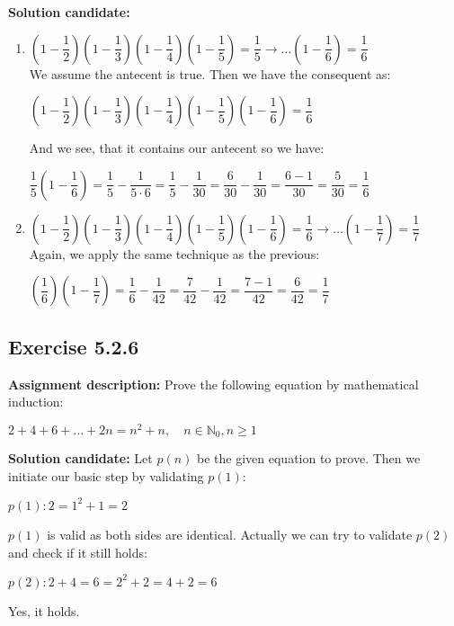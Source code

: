 \documentclass{report}
\newcommand{\cent}[1]{\begin{center}#1\end{center}}
\newcommand{\doubleN}{\mathbb{N}}
\newcommand{\In}{\! \in \!}
\newcommand{\assignmentDescription}{\textbf{Assignment description: }}
\newcommand{\solution}{\textbf{Solution candidate: }}
\newcommand{\QED}{\boxed{}}
\newcommand{\Exercise}[1]{\subsection{Exercise #1}}
\newcommand{\defaultEnumerateLabel}{\textbf{\alph*.}}
\newcommand{\myItem}[1]{\item #1\\}
\newcommand{\parenthesis}[1]{\left( #1 \right)}
\begin{document}
 	\solution
 	\begin{enumerate}[label=\defaultEnumerateLabel]
 		\myItem{$\parenthesis{1 - \dfrac{1}{2}}\parenthesis{1 - \dfrac{1}{3}}\parenthesis{1 - \dfrac{1}{4}}\parenthesis{1 - \dfrac{1}{5}} = \dfrac{1}{5} \to \dots \parenthesis{1 - \dfrac{1}{6}} = \dfrac{1}{6} $}
 		
 		We assume the antecent is true. Then we have the consequent as:
 		
 		\cent{$\parenthesis{1 - \dfrac{1}{2}}\parenthesis{1 - \dfrac{1}{3}}\parenthesis{1 - \dfrac{1}{4}}\parenthesis{1 - \dfrac{1}{5}}\parenthesis{1 - \dfrac{1}{6}} = \dfrac{1}{6}$}
 		
 		And we see, that it contains our antecent so we have: 
 		
 		\cent{$\dfrac{1}{5}\parenthesis{1 - \dfrac{1}{6}} =\dfrac{1}{5} - \dfrac{1}{5 \cdot 6} = \dfrac{1}{5} - \dfrac{1}{30} = \dfrac{6}{30} - \dfrac{1}{30} = \dfrac{6-1}{30} = \dfrac{5}{30} = \dfrac{1}{6}$}
 		
 		\QED
 		
 		\myItem{$\parenthesis{1 - \dfrac{1}{2}}\parenthesis{1 - \dfrac{1}{3}}\parenthesis{1 - \dfrac{1}{4}}\parenthesis{1 - \dfrac{1}{5}}\parenthesis{1 - \dfrac{1}{6}} = \dfrac{1}{6} \to \dots \parenthesis{1 - \dfrac{1}{7}} = \dfrac{1}{7} $}
 		
 		Again, we apply the same technique as the previous:
 		
 		\cent{$\parenthesis{\dfrac{1}{6}}\parenthesis{1 - \dfrac{1}{7}} = \dfrac{1}{6} - \dfrac{1}{42} = \dfrac{7}{42} - \dfrac{1}{42} = \dfrac{7-1}{42} = \dfrac{6}{42} = \dfrac{1}{7}$}
 		
 	\end{enumerate}
 	
 	\Exercise{5.2.6}
 	
 	\assignmentDescription
 	Prove the following equation by mathematical induction:
 	
 	\cent{$2+4+6+\dots +2n = n^2 + n, \quad n \In \doubleN_0, n \geq 1$}
 	
 	\solution
	Let $p(n)$ be the given equation to prove. Then we initiate our basic step by validating $p(1)$:
	
	\cent{$p(1) : 2 = 1^2 + 1 = 2$}
	
	$p(1)$ is valid as both sides are identical. Actually we can try to validate $p(2)$ and check if it still holds:
	
	\cent{$p(2) : 2 + 4 = 6 =2^2 + 2 = 4+2 = 6$}
	
	Yes, it holds.\\
	
\end{document}

